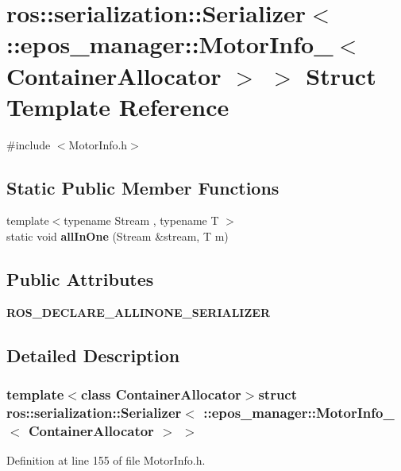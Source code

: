 \section{ros\-:\-:serialization\-:\-:\-Serializer$<$ \-:\-:epos\-\_\-manager\-:\-:\-Motor\-Info\-\_\-$<$ \-Container\-Allocator $>$ $>$ \-Struct \-Template \-Reference}
\label{structros_1_1serialization_1_1Serializer_3_01_1_1epos__manager_1_1MotorInfo___3_01ContainerAllocator_01_4_01_4}


{\ttfamily \#include $<$\-Motor\-Info.\-h$>$}

\subsection*{\-Static \-Public \-Member \-Functions}
\begin{DoxyCompactItemize}
\item 
{\footnotesize template$<$typename Stream , typename T $>$ }\\static void {\bf all\-In\-One} (\-Stream \&stream, \-T m)
\end{DoxyCompactItemize}
\subsection*{\-Public \-Attributes}
\begin{DoxyCompactItemize}
\item 
{\bf \-R\-O\-S\-\_\-\-D\-E\-C\-L\-A\-R\-E\-\_\-\-A\-L\-L\-I\-N\-O\-N\-E\-\_\-\-S\-E\-R\-I\-A\-L\-I\-Z\-E\-R}
\end{DoxyCompactItemize}


\subsection{\-Detailed \-Description}
\subsubsection*{template$<$class Container\-Allocator$>$struct ros\-::serialization\-::\-Serializer$<$ \-::epos\-\_\-manager\-::\-Motor\-Info\-\_\-$<$ Container\-Allocator $>$ $>$}



\-Definition at line 155 of file \-Motor\-Info.\-h.



